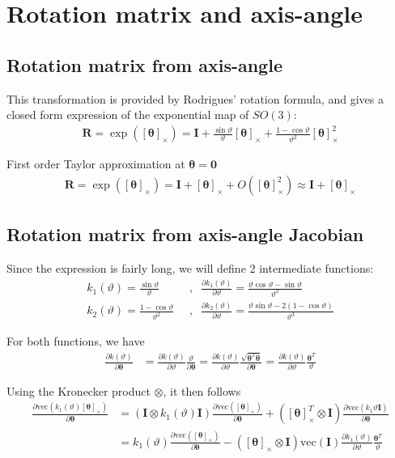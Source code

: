 \documentclass{article}
\renewcommand\aa{\bm{\theta}}
\renewcommand\t{\vartheta}
\newcommand\R{\bm{R}}
\newcommand\I{\bm{I}}
\renewcommand\skew[1]{[#1]_{\times}}
\newcommand\vecop[1]{\text{vec} \left( #1\right)}
\begin{document}
\section{Rotation matrix and axis-angle}
\subsection{Rotation matrix from axis-angle}
This transformation is provided by Rodrigues' rotation formula, and gives a closed form expression of the exponential map of $SO(3)$:
\begin{align}
  \R = \exp(\skew{\aa}) = \I + \frac{\sin \t}{\t} \skew{\aa} + \frac{1 - \cos \t}{\t^2} \skew{\aa}^2 
\end{align}

First order Taylor approximation at $\aa = \bm{0}$
\begin{align}
  \R = \exp(\skew{\aa}) = \I + \skew{\aa} + O(\skew{\aa}^2) \approx \I + \skew{\aa}
\end{align}

\subsection{Rotation matrix from axis-angle Jacobian}
Since the expression is fairly long, we will define 2 intermediate functions:
\begin{align}
  k_1(\t) = \frac{\sin{\t}}{\t} \;\;&,\;\;
  \frac{\partial k_1(\t)}{\partial \t} = \frac{\t\cos{\t} - \sin{\t}}{\t^2} \\
  k_2(\t) = \frac{1-\cos{\t}}{\t^2} \;\;&,\;\;
  \frac{\partial k_2(\t)}{\partial \t} = \frac{\t\sin{\t} - 2\left(1-\cos{\t} \right)}{\t^3}
\end{align}

For both functions, we have
\begin{align}
  \frac{\partial k(\t)}{\partial \aa} &= 
    \frac{\partial k(\t)}{\partial \t} \frac{\t}{\partial \aa} =
    \frac{\partial k(\t)}{\partial \t} \frac{\sqrt{\aa^T\aa}}{\partial \aa} =
    \frac{\partial k(\t)}{\partial \t} \frac{\aa^T}{\t}
\end{align}

Using the Kronecker product $\otimes$, it then follows
\begin{align}
  \frac{\partial \vecop{k_1(\t) \skew{\aa}}}{\partial \aa}  
  &= \left( \I \otimes k_1(\t)\I \right) \frac{\partial \vecop{\skew{\aa}}}{\partial \aa}
    + \left(\skew{\aa}^T \otimes \I \right) \frac{\partial \vecop{k_1{\t}\I}}{\partial \aa} \\
  &= k_1(\t) \frac{\partial \vecop{\skew{\aa}}}{\partial \aa}
    - \left(\skew{\aa} \otimes \I \right) \vecop{\I} \frac{\partial k_1(\t)}{\partial \t} \frac{\aa^T}{\t}
\end{align}
\end{document}
